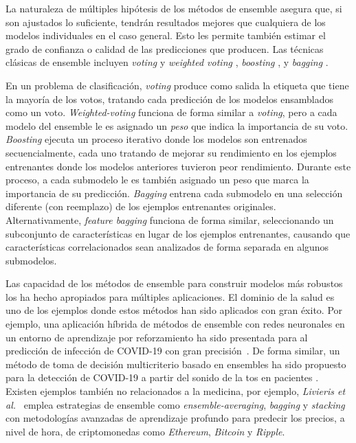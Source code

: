 La naturaleza de múltiples hipótesis de los métodos de ensemble asegura que, si son ajustados lo suficiente, tendrán resultados mejores que cualquiera de los modelos individuales en el caso general. Esto les permite también estimar el grado de confianza o calidad de las predicciones que producen. Las técnicas clásicas de ensemble incluyen \emph{voting} y \textit{weighted voting} \parencite{dietterich2000ensemble}, \emph{boosting} \parencite{schapire1990strength}, y \emph{bagging} \parencite{breiman1996bagging}.

En un problema de clasificación, \emph{voting} produce como salida la etiqueta que tiene la mayoría de los votos, tratando cada predicción de los modelos ensamblados como un voto.
\emph{Weighted-voting} funciona de forma similar a \emph{voting}, pero a cada modelo del ensemble le es asignado un \emph{peso} que indica la importancia de su voto.
\emph{Boosting} ejecuta un proceso iterativo donde los modelos son entrenados secuencialmente, cada uno tratando de mejorar su rendimiento en los ejemplos entrenantes donde los modelos anteriores tuvieron peor rendimiento.
Durante este proceso, a cada submodelo le es también asignado un peso que marca la importancia de su predicción.
\textit{Bagging} entrena cada submodelo en una selección diferente (con reemplazo) de los ejemplos entrenantes originales.
Alternativamente, \textit{feature bagging} funciona de forma similar, seleccionando un subconjunto de características en lugar de los ejemplos entrenantes, causando que características correlacionados sean analizados de forma separada en algunos submodelos.

Las capacidad de los métodos de ensemble para construir modelos más robustos los ha hecho apropiados para múltiples aplicaciones.
El dominio de la salud es uno de los ejemplos donde estos métodos han sido aplicados con gran éxito.
Por ejemplo, una aplicación híbrida de métodos de ensemble con redes neuronales en un entorno de aprendizaje por reforzamiento ha sido presentada para al predicción de infección de COVID-19 con gran precisión~\parencite{JIN2022105560}.
De forma similar, un método de toma de decisión multicriterio basado en ensembles ha sido propuesto para la detección de COVID-19 a partir del sonido de la tos en pacientes \parencite{CHOWDHURY2022105405}.
Existen ejemplos también no relacionados a la medicina, por ejemplo, \emph{Livieris et al.}~\parencite{livieris2020ensemble} emplea estrategias de ensemble como \textit{ensemble-averaging}, \textit{bagging} y \textit{stacking} con metodologías avanzadas de aprendizaje profundo para predecir los precios, a nivel de hora, de criptomonedas como \textit{Ethereum}, \textit{Bitcoin} y \textit{Ripple}.

